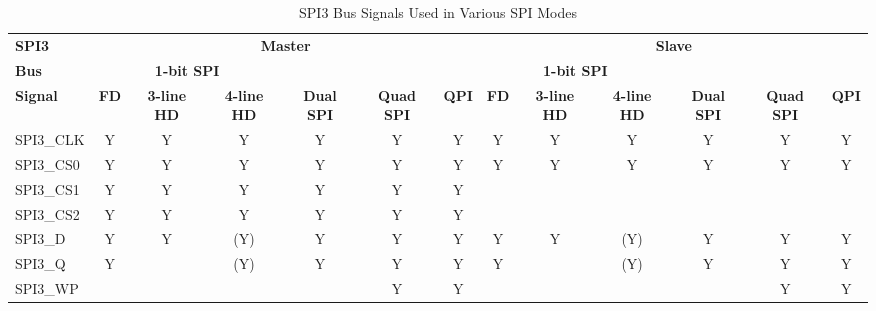 \documentclass[main\_\_EN.tex]{subfiles}
\begin{document}
\begin{landscape}
\begin{table}[H]
    \centering
    \caption{SPI3 Bus Signals Used in Various SPI Modes}
    \label{tab:spi3-bus-singals-used-in-various-spi-modes}

    \begin{threeparttable}
    \begin{tabular}{ |p{2.0cm} |c|c|c|c|c|c|c|c|c|c|c|c| }
    \hline
        \rowcolor{lightgray}
        \textbf{SPI3} & \multicolumn{6}{c|}{\textbf{Master}} & \multicolumn{6}{c|}{\textbf{Slave}} \\\cline{2-13}
        \rowcolor{lightgray}
        \textbf{Bus} & \multicolumn{3}{c|}{\textbf{1-bit SPI}} & & & & \multicolumn{3}{c|}{\textbf{1-bit SPI}} & & & \\ \cline{2-4} \cline{8-10}
        \rowcolor{lightgray}
        \textbf{Signal} & \textbf{FD\tnote{1}} & \textbf{3-line HD\tnote{2}} & \textbf{4-line HD} & \multirow{-2}{*}{\textbf{Dual SPI}} & \multirow{-2}{*}{\textbf{Quad SPI}} & \multirow{-2}{*}{\textbf{QPI}} & \textbf{FD} & \textbf{3-line HD} & \textbf{4-line HD} & \multirow{-2}{*}{\textbf{Dual SPI}} & \multirow{-2}{*}{\textbf{Quad SPI}} & \multirow{-2}{*}{\textbf{QPI}} \\ \hline
SPI3\_CLK                  & Y       & Y       & Y       & Y       & Y       & Y      & Y       & Y      & Y       & Y       & Y       & Y      \\ \hline
SPI3\_CS0                  & Y       & Y       & Y       & Y       & Y       & Y      & Y       & Y      & Y       & Y       & Y       & Y      \\ \hline
SPI3\_CS1                  & Y       & Y       & Y       & Y       & Y       & Y      &         &        &         &         &         &        \\ \hline
SPI3\_CS2                  & Y       & Y       & Y       & Y       & Y       & Y      &         &        &         &         &         &        \\ \hline
SPI3\_D                    & Y       & Y       & (Y)\tnote{3}      & Y\tnote{4}      & Y\tnote{5}      & Y      & Y       & Y      & (Y)\tnote{6}      & Y\tnote{7}     & Y\tnote{8}     & Y      \\ \hline
SPI3\_Q                    & Y       &         & (Y)\tnote{3}      & Y\tnote{4}      & Y\tnote{5}      & Y      & Y       &        & (Y)\tnote{6}     & Y\tnote{7}     & Y\tnote{8}      & Y      \\ \hline
SPI3\_WP                   &         &         &         &         & Y\tnote{5}      & Y      &         &        &         &         & Y\tnote{8}       & Y      \\ \hline

\end{tabular}
\end{threeparttable}
\end{table}
\end{landscape}
\end{document}
